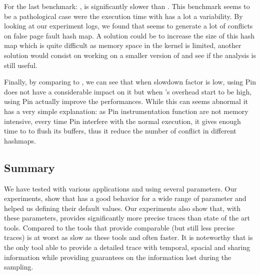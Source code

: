 For the last benchmark: \MG, \Moca is significantly slower than \TABARNAC. This benchmark
seems to be a pathological case were the execution time with \Moca has a lot a
variability. By looking at our experiment logs, we found that \MG seems to
generate a lot of conflicts on \Moca false page fault hash map. A solution
could be to increase the size of this hash map which is quite difficult as
memory space in the kernel is limited, another solution would consist on
working on a smaller version of \MG and see if the analysis is still useful.


Finally, by comparing \Moca to \MocaPin, we can see that when \Moca slowdown
factor is low, using Pin does not have a considerable impact on it but when
\Moca's overhead start to be high, using Pin actually improve the
performances. While this can seems abnormal it has a very simple explanation:
as Pin instrumentation function are not memory intensive, every time Pin
interfere with the normal execution, it gives enough time to \Moca to flush
its buffers, thus it reduce the number of conflict in \Moca different
hashmaps.

\subsection{Summary}
\label{sec:expe-cncl}

We have tested \Moca with various applications and using several parameters.
Our experiments, show that \Moca has a good behavior for a wide range of
parameter and helped us defining their default values. Our experiments also
show that, with these parameters, provides significantly more precise traces
than state of the art tools. Compared to the tools that provide comparable
(but still less precise traces) \Moca is at worst as slow as these tools and
often faster.  It is noteworthy that \Moca is the only tool able to provide a
detailed trace with temporal, spacial and sharing information while providing
guarantees on the information lost during the sampling.
